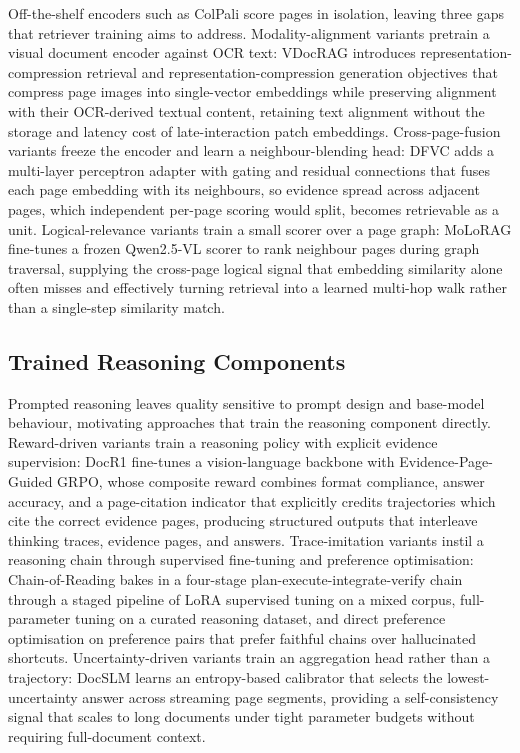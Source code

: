 \documentclass[11pt]{article}
\begin{document}
Off-the-shelf encoders such as ColPali \cite{faysse2024colpali} score pages in isolation, leaving three gaps that retriever training aims to address. Modality-alignment variants pretrain a visual document encoder against OCR text: VDocRAG \cite{tanaka2025vdocrag} introduces representation-compression retrieval and representation-compression generation objectives that compress page images into single-vector embeddings while preserving alignment with their OCR-derived textual content, retaining text alignment without the storage and latency cost of late-interaction patch embeddings. Cross-page-fusion variants freeze the encoder and learn a neighbour-blending head: DFVC \cite{qian2026accurate} adds a multi-layer perceptron adapter with gating and residual connections that fuses each page embedding with its neighbours, so evidence spread across adjacent pages, which independent per-page scoring would split, becomes retrievable as a unit. Logical-relevance variants train a small scorer over a page graph: MoLoRAG \cite{wu2025molorag} fine-tunes a frozen Qwen2.5-VL scorer to rank neighbour pages during graph traversal, supplying the cross-page logical signal that embedding similarity alone often misses and effectively turning retrieval into a learned multi-hop walk rather than a single-step similarity match.

\subsection{Trained Reasoning Components}
\label{sec:train-reasoning}

Prompted reasoning leaves quality sensitive to prompt design and base-model behaviour, motivating approaches that train the reasoning component directly. Reward-driven variants train a reasoning policy with explicit evidence supervision: DocR1 \cite{xiong2026docr1} fine-tunes a vision-language backbone with Evidence-Page-Guided GRPO, whose composite reward combines format compliance, answer accuracy, and a page-citation indicator that explicitly credits trajectories which cite the correct evidence pages, producing structured outputs that interleave thinking traces, evidence pages, and answers. Trace-imitation variants instil a reasoning chain through supervised fine-tuning and preference optimisation: Chain-of-Reading \cite{guo2026endtoend} bakes in a four-stage plan-execute-integrate-verify chain through a staged pipeline of LoRA supervised tuning on a mixed corpus, full-parameter tuning on a curated reasoning dataset, and direct preference optimisation on preference pairs that prefer faithful chains over hallucinated shortcuts. Uncertainty-driven variants train an aggregation head rather than a trajectory: DocSLM \cite{hannan2025docslm} learns an entropy-based calibrator that selects the lowest-uncertainty answer across streaming page segments, providing a self-consistency signal that scales to long documents under tight parameter budgets without requiring full-document context.
\end{document}
